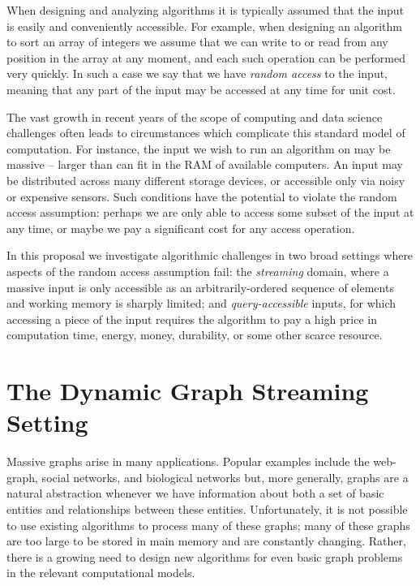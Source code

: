 \label{chap:intro}


When designing and analyzing algorithms it is typically assumed that the input is easily and conveniently accessible.  For example, when designing an algorithm to sort an array of integers we assume that we can write to or read from any position in the array at any moment, and each such operation can be performed very quickly.  In such a case we say that we have \emph{random access} to the input, meaning that any part of the input may be accessed at any time for unit cost.

The vast growth in recent years of the scope of computing and data science challenges often leads to circumstances which complicate this standard model of computation.  For instance, the input we wish to run an algorithm on may be massive -- larger than can fit in the RAM of available computers.  An input may be distributed across many different storage devices, or accessible only via noisy or expensive sensors.  Such conditions have the potential to violate the random access assumption:  perhaps we are only able to access some subset of the input at any time, or maybe we pay a significant cost for any access operation.

In this proposal we investigate algorithmic challenges in two broad settings where aspects of the random access assumption fail: the \emph{streaming} domain, where a massive input is only accessible as an arbitrarily-ordered sequence of elements and working memory is sharply limited; and \emph{query-accessible} inputs, for which accessing a piece of the input requires the algorithm to pay a high price in computation time, energy, money, durability, or some other scarce resource.

\section{The Dynamic Graph Streaming Setting}

Massive graphs arise in many applications. Popular examples include the web-graph, social networks, and biological networks but, more generally, graphs are a natural abstraction whenever we have information about both a set of basic entities and relationships between these entities. Unfortunately, it is not possible to use existing algorithms to process many of these graphs; many of these graphs are too large to be stored in main memory and are constantly changing. Rather, there is a growing need to design new algorithms for even basic graph problems in the relevant computational models. 

